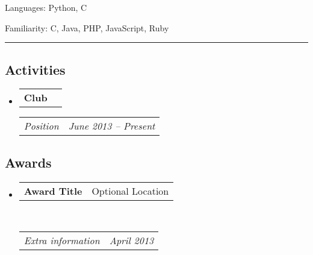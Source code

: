 \documentclass[10pt,letterpaper]{article}
\makeatletter
\newenvironment{indentsection}[1]%
{\begin{list}{}%
	{\setlength{\leftmargin}{#1}}%
	\item[]%
}
{\end{list}}
\newcommand{\headerrow}[2]
{\begin{tabular*}{\linewidth}{l@{\extracolsep{\fill}}r}
	#1 &
	#2 \\
\end{tabular*}}
\newcommand{\CPP}
{C\nolinebreak[4]\hspace{-.05em}\raisebox{.22ex}{\footnotesize\bf ++}}
\makeatother
\begin{document}
\begin{indentsection}{\parindent}
\begin{description*}
	\item[Languages:] Python, C 
    \item[Familiarity:] \CPP, Java, PHP, JavaScript, Ruby
\end{description*}
\end{indentsection}

\hrule

\begin{multicols}{2} 

\vspace{-0.4em}
\subsection*{Activities}

\begin{itemize}
	\parskip=0.1em
	\item
	\headerrow
		{\textbf{Club}} {}
    \headerrow
        {\emph{Position}}
        {\emph{June 2013 -- Present}}
\end{itemize}

\vspace{-0.4em}
\subsection*{Awards}

\begin{itemize}
    \item
    \headerrow
        {\textbf{Award Title}} {Optional Location} \\
    \headerrow
        {\emph{Extra information}}
        {\emph{April 2013}}
\end{itemize}

\end{multicols}
\end{document}
